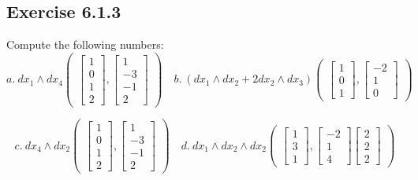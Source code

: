 \documentclass[12pt]{article}
\begin{document}
\newpage





\subsection*{Exercise 6.1.3}
Compute the following numbers:
$$a.\ dx_1\wedge dx_4
        \begin{pmatrix}
          \begin{bmatrix}
           1 \\
           0 \\
           1 \\
           2
          \end{bmatrix},
          \begin{bmatrix}
           1\\-3\\-1\\2
         \end{bmatrix}
    \end{pmatrix}
    \quad
    b.\ (dx_1\wedge dx_2+2dx_2\wedge dx_3)
     \begin{pmatrix}
          \begin{bmatrix}
            1\\0\\1
          \end{bmatrix},
          \begin{bmatrix}
          -2\\1\\0
         \end{bmatrix}
    \end{pmatrix}
$$

$$
c.\ dx_4\wedge dx_2
\begin{pmatrix}
          \begin{bmatrix}
            1\\0\\1\\2
          \end{bmatrix},
          \begin{bmatrix}
           1\\-3\\-1\\2
         \end{bmatrix}
    \end{pmatrix}
    \quad
    d.\ dx_1\wedge dx_2\wedge dx_2
    \begin{pmatrix}
          \begin{bmatrix}
            1\\3\\1
          \end{bmatrix},
          \begin{bmatrix}
           -2\\1\\4
         \end{bmatrix}
          \begin{bmatrix}
           2\\2\\2
         \end{bmatrix}
    \end{pmatrix}
$$
\medskip
\end{document}
